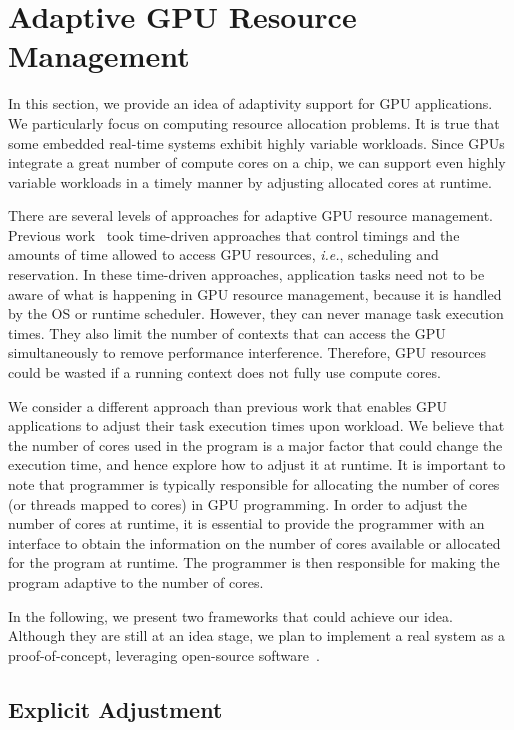 \documentclass[times, 10pt, twocolumn]{article}
\begin{document}
\section{Adaptive GPU Resource Management}
\label{sec:adaptivity_support}

In this section, we provide an idea of adaptivity support for GPU
applications.
We particularly focus on computing resource allocation problems.
It is true that some embedded real-time systems exhibit highly variable
workloads.
Since GPUs integrate a great number of compute cores on a chip, we can
support even highly variable workloads in a timely manner by adjusting
allocated cores at runtime.

There are several levels of approaches for adaptive GPU resource
management.
Previous work~\cite{Kato_RTAS11, Kato_RTSS11, Kato_ATC11} took
time-driven approaches that control timings and the amounts of time
allowed to access GPU resources, \textit{i.e.}, scheduling and
reservation.
In these time-driven approaches, application tasks need not to be aware
of what is happening in GPU resource management, because it is handled
by the OS or runtime scheduler.
However, they can never manage task execution times.
They also limit the number of contexts that can access the GPU
simultaneously to remove performance interference.
Therefore, GPU resources could be wasted if a running context does not
fully use compute cores.

We consider a different approach than previous work that enables GPU
applications to adjust their task execution times upon workload.
We believe that the number of cores used in the program is a major
factor that could change the execution time, and hence explore how to
adjust it at runtime.
It is important to note that programmer is typically responsible for
allocating the number of cores (or threads mapped to cores) in GPU
programming.
In order to adjust the number of cores at runtime, it is essential to
provide the programmer with an interface to obtain the information on
the number of cores available or allocated for the program at runtime.
The programmer is then responsible for making the program adaptive to
the number of cores.

In the following, we present two frameworks that could achieve our idea.
Although they are still at an idea stage, we plan to implement a real
system as a proof-of-concept, leveraging open-source
software~\cite{Kato_OSPERT11}.

\subsection{Explicit Adjustment}
\end{document}
